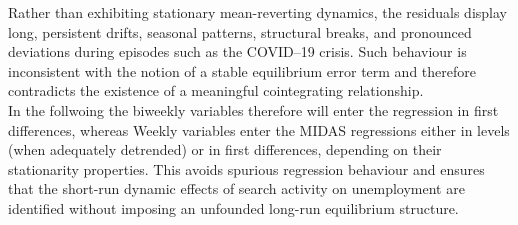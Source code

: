 \documentclass[12pt,a4paper]{article}
\begin{document}
Rather than exhibiting 
stationary mean-reverting dynamics, the residuals display long, persistent drifts, 
seasonal patterns, structural breaks, and pronounced deviations during episodes such 
as the COVID--19 crisis. Such behaviour is inconsistent with the notion of a stable 
equilibrium error term and therefore contradicts the existence of a meaningful 
cointegrating relationship.
\\
In the follwoing the biweekly variables therefore will enter the regression in first differences, whereas Weekly variables enter the MIDAS regressions either in levels (when adequately detrended) or in first 
differences, depending on their stationarity properties.
This avoids spurious regression behaviour and ensures that the short-run 
dynamic effects of search activity on unemployment are identified without imposing an 
unfounded long-run equilibrium structure.
\end{document}
